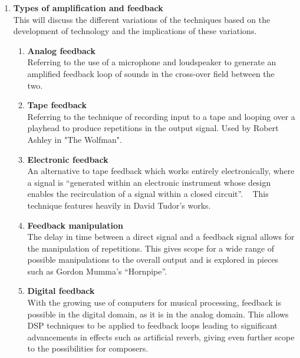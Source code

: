 \documentclass{scrartcl}
\begin{document}
    \begin{enumerate}
        \item \textbf{Types of amplification and feedback}\\
            This will discuss the different variations of the techniques based
            on the development of technology and the implications of these
            variations.

        \begin{enumerate}[label*=\arabic*.]
            \item \textbf{Analog feedback}\\
                Referring to the use of a microphone and loudspeaker to
                generate an amplified feedback loop of sounds in the cross-over
                field between the two.~\parencite[p.185]{holmes2012eaem}

            \item \textbf{Tape feedback}\\
                Referring to the technique of recording input to a tape and
                looping over a playhead to produce repetitions in the output
                signal. Used by Robert Ashley in "The
                Wolfman".~\parencite[p.186]{holmes2012eaem}

            \item \textbf{Electronic feedback}\\
                An alternative to tape feedback which works entirely
                electronically, where a signal is ``generated within an
                electronic instrument whose design enables the recirculation of
                a signal within a closed circuit''.
                ~\parencite[p.187]{holmes2012eaem} This technique features heavily
                in David Tudor's works.
                ~\parencite{tudor1996twfle, tudor2004lem}


            \item \textbf{Feedback manipulation}\\
                The delay in time between a direct signal and a feedback signal
                allows for the manipulation of repetitions. This gives scope
                for a wide range of possible manipulations to the overall
                output and is explored in pieces such as Gordon Mumma's
                ``Hornpipe''. ~\parencite[p.390]{holmes2012eaem}

            \item \textbf{Digital feedback}\\
                With the growing use of computers for musical processing,
                feedback is possible in the digital domain, as it is in the
                analog domain. This allows DSP techniques to be applied to
                feedback loops leading to significant advancements in effects
                such as artificial reverb, giving even further scope to the
                possibilities for composers.


\end{enumerate}
\end{enumerate}
\end{document}
